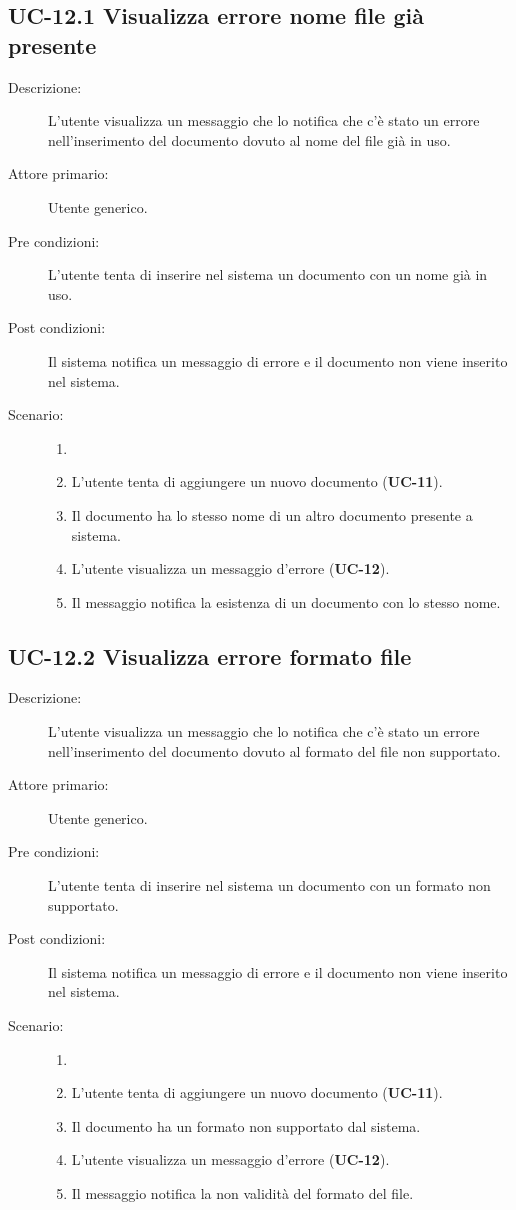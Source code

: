 \subsection{UC-12.1 Visualizza errore nome file già presente}
\begin{description}
    \item[Descrizione:] L'utente visualizza un messaggio che lo notifica che c'è stato un errore nell'inserimento del documento dovuto al nome del file già in uso.
    \item[Attore primario:] Utente generico.
    \item[Pre condizioni:] L'utente tenta di inserire nel sistema un documento con un nome già in uso.
    \item[Post condizioni:] Il sistema notifica un messaggio di errore e il documento non viene inserito nel sistema.
    \item[Scenario:]
    \begin{enumerate}
        \item[]
        \item L’utente tenta di aggiungere un nuovo documento (\textbf{UC-11}).
        \item Il documento ha lo stesso nome di un altro documento presente a sistema.
        \item L'utente visualizza un messaggio d'errore (\textbf{UC-12}).
        \item Il messaggio notifica la esistenza di un documento con lo stesso nome.
    \end{enumerate}
\end{description}

\subsection{UC-12.2 Visualizza errore formato file}
\begin{description}
    \item[Descrizione:] L'utente visualizza un messaggio che lo notifica che c'è stato un errore nell'inserimento del documento dovuto al formato del file non supportato.
    \item[Attore primario:] Utente generico.
    \item[Pre condizioni:] L'utente tenta di inserire nel sistema un documento con un formato non supportato.
    \item[Post condizioni:] Il sistema notifica un messaggio di errore e il documento non viene inserito nel sistema.
    \item[Scenario:] 
    \begin{enumerate}
        \item[]
        \item L’utente tenta di aggiungere un nuovo documento (\textbf{UC-11}).
        \item Il documento ha un formato non supportato dal sistema.
        \item L'utente visualizza un messaggio d'errore (\textbf{UC-12}).
        \item Il messaggio notifica la non validità del formato del file.
    \end{enumerate}
\end{description}

